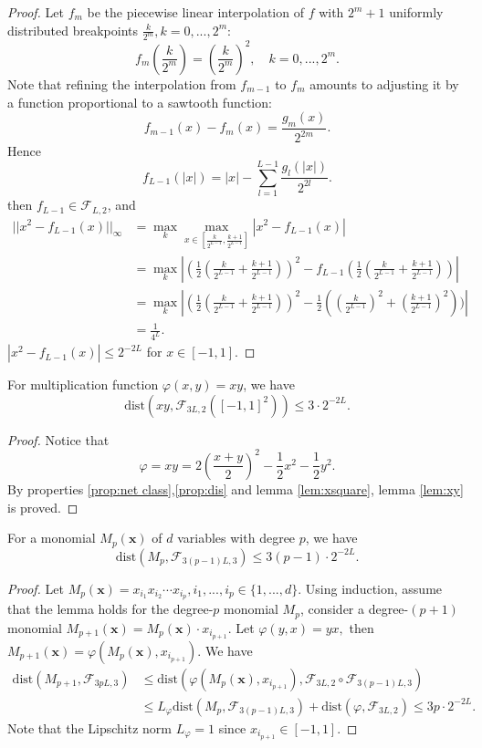\begin{proof}
Let $f_m$ be the piecewise linear interpolation of $f$ with $2^m+1$ uniformly distributed breakpoints $\frac{k}{2^m},k = 0,...,2^m:$
$$
f_{m}(\frac{k}{2^m}) = (\frac{k}{2^m})^2,\quad k = 0,...,2^m.
$$
Note that refining the interpolation from $f_{m-1}$ to $f_m$ amounts to adjusting it by a function proportional to a sawtooth function:
$$
f_{m-1}(x) - f_m(x) = \frac{g_m(x)}{2^{2m}}.
$$
Hence 
$$
f_{L-1}(|x|) = |x| - \sum_{l=1}^{L-1}\frac{g_l(|x|)}{2^{2l}} .
$$
then $f_{L-1}\in \mathcal{F}_{L,2}$, and 
\[
\begin{split}
||x^2-f_{L-1}(x)||_{\infty} & = \max_{k} \max_{x\in [\frac{k}{2^{L-1}},\frac{k+1}{2^{L-1}}]} |x^2 - f_{L-1}(x)|\\
  & = \max_{k} |(\frac{1}{2}(\frac{k}{2^{L-1}}+\frac{k+1}{2^{L-1}}))^2 - f_{L-1}(\frac{1}{2}(\frac{k}{2^{L-1}}+\frac{k+1}{2^{L-1}}))|\\
  & = \max_k |(\frac{1}{2}(\frac{k}{2^{L-1}}+\frac{k+1}{2^{L-1}}))^2 - \frac{1}{2}((\frac{k}{2^{L-1}})^2+(\frac{k+1}{2^{L-1}})^2))|\\
  &=\frac{1}{4^L}.
\end{split}
\]
$|x^2-f_{L-1}(x)|\le 2^{-2L}$ for $x\in[-1,1].$
\end{proof}

\begin{lemma}\label{lem:xy}
For multiplication function $\varphi(x,y) = xy$, we have 
$$
\mbox{dist}(xy,\mathcal{F}_{3L,2}([-1,1]^2))\le 3\cdot 2^{-2L}.
$$
\begin{proof}
Notice that
$$
\varphi = xy = 2\left(\frac{x+y}{2} \right)^2-\frac{1}{2}x^2-\frac{1}{2}y^2.
$$
By properties \ref{prop:net class},\ref{prop:dis} and lemma \ref{lem:xsquare}, lemma \ref{lem:xy} is proved.
\end{proof}
\end{lemma}

\begin{lemma}
For a monomial $M_p(\bm x)$ of $d$ variables with degree $p$, we have
$$
\mbox{dist}(M_p,\mathcal F_{3(p-1)L,3})\le 3(p-1)\cdot 2^{-2L}.
$$
\end{lemma}

\begin{proof}
Let $M_p(\bm x)=x_{i_1}x_{i_2}\cdots x_{i_p},i_1,...,i_p\in\{1,...,d\}.$ Using induction, assume that the lemma holds for the degree-$p$ monomial $M_p$, consider a degree-$(p+1)$ monomial $M_{p+1}(\bm{x}) = M_p(\bm{x})\cdot x_{i_{p+1}}$. Let $\varphi(y,x) = yx,$ then $M_{p+1}(\bm x) = \varphi(M_p(\bm{x}),x_{i_{p+1}})$. We have
\[
\begin{split}
\mbox{dist}(M_{p+1},\mathcal{F}_{3pL,3})&\le \mbox{dist}(\varphi(M_p(\bm x),x_{i_{p+1}}),\mathcal F_{3L,2}\circ \mathcal F_{3(p-1)L,3})\\
& \le L_{\varphi}\mbox{dist}(M_p,\mathcal{F}_{3(p-1)L,3})+\mbox{dist}(\varphi,\mathcal F_{3L,2})\le 3p\cdot 2^{-2L}.
\end{split}
\]
Note that the Lipschitz norm $L_{\varphi}=1$ since $x_{i_{p+1}}\in [-1,1].$
\end{proof}

